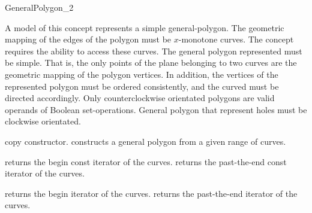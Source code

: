 \ccRefPageBegin

\begin{ccRefConcept}{GeneralPolygon_2}

\ccTypes


\ccGlue
{}

\ccDefinition
A model of this concept represents a simple general-polygon. The
geometric mapping of the edges of the polygon must be $x$-monotone curves.
The concept requires the ability to access these curves. 
The general polygon represented must be simple. That is, the
only points of the plane belonging to two curves are the geometric mapping
of the polygon vertices. In addition, the vertices of the represented 
polygon must be ordered consistently, and the curved must be directed 
accordingly. Only counterclockwise orientated polygons are valid operands
of Boolean set-operations. General polygon that represent holes must be
clockwise orientated.

\ccCreation
{}

\ccThreeToTwo

\ccGlue
{}
{copy constructor.}
\ccGlue
{}
\ccGlue
{}
{constructs a general polygon from a given range of curves.}

\ccAccessFunctions

{returns the begin const iterator of the curves.}
\ccGlue
{} 
{returns the past-the-end const iterator of the curves.}

{returns the begin iterator of the curves.}
\ccGlue
{} 
{returns the past-the-end iterator of the curves.}


\end{ccRefConcept}
